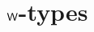 \documentclass[hott-all.tex]{subfiles}
\begin{document}
\section{\texorpdfstring{$\mathsf{W}$}{W}-types}
% 
% 
% 
% 
\end{document}
